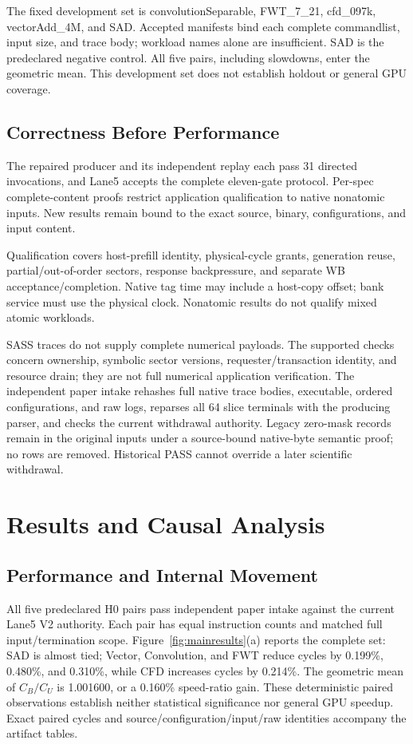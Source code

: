 \documentclass[conference,letterpaper]{IEEEtran}
\begin{document}
The fixed development set is convolutionSeparable, FWT\_7\_21, cfd\_097k, vectorAdd\_4M, and SAD. Accepted manifests bind each complete commandlist, input size, and trace body; workload names alone are insufficient. SAD is the predeclared negative control. All five pairs, including slowdowns, enter the geometric mean. This development set does not establish holdout or general GPU coverage.

\subsection{Correctness Before Performance}
The repaired producer and its independent replay each pass 31 directed invocations, and Lane5 accepts the complete eleven-gate protocol. Per-spec complete-content proofs restrict application qualification to native nonatomic inputs. New results remain bound to the exact source, binary, configurations, and input content.

Qualification covers host-prefill identity, physical-cycle grants, generation reuse, partial/out-of-order sectors, response backpressure, and separate WB acceptance/completion. Native tag time may include a host-copy offset; bank service must use the physical clock. Nonatomic results do not qualify mixed atomic workloads.

SASS traces do not supply complete numerical payloads. The supported checks concern ownership, symbolic sector versions, requester/transaction identity, and resource drain; they are not full numerical application verification. The independent paper intake rehashes full native trace bodies, executable, ordered configurations, and raw logs, reparses all 64 slice terminals with the producing parser, and checks the current withdrawal authority. Legacy zero-mask records remain in the original inputs under a source-bound native-byte semantic proof; no rows are removed. Historical PASS cannot override a later scientific withdrawal.

\section{Results and Causal Analysis}
\subsection{Performance and Internal Movement}
All five predeclared H0 pairs pass independent paper intake against the current Lane5 V2 authority. Each pair has equal instruction counts and matched full input/termination scope. Figure~\ref{fig:mainresults}(a) reports the complete set: SAD is almost tied; Vector, Convolution, and FWT reduce cycles by 0.199\%, 0.480\%, and 0.310\%, while CFD increases cycles by 0.214\%. The geometric mean of $C_B/C_U$ is 1.001600, or a 0.160\% speed-ratio gain. These deterministic paired observations establish neither statistical significance nor general GPU speedup. Exact paired cycles and source/configuration/input/raw identities accompany the artifact tables.
\end{document}
